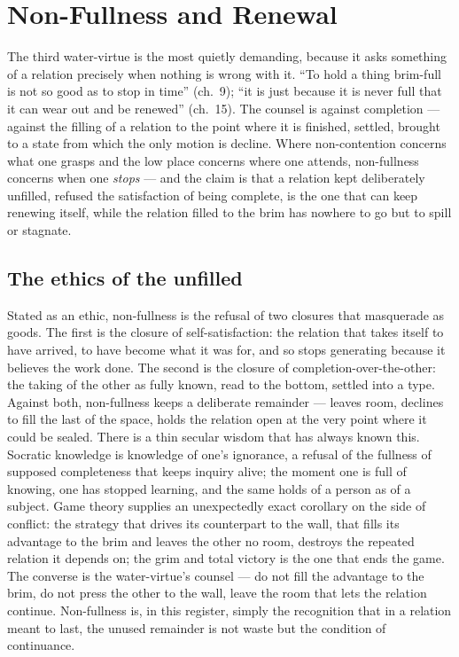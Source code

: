 \section{Non-Fullness and Renewal}
\label{p20:sec:nonfullness}

\noindent
The third water-virtue is the most quietly demanding, because it asks something of a relation precisely when nothing is wrong with it. ``To hold a thing brim-full is not so good as to stop in time'' (ch.~9); ``it is just because it is never full that it can wear out and be renewed'' (ch.~15). The counsel is against completion --- against the filling of a relation to the point where it is finished, settled, brought to a state from which the only motion is decline. Where non-contention concerns what one grasps and the low place concerns where one attends, non-fullness concerns when one \emph{stops} --- and the claim is that a relation kept deliberately unfilled, refused the satisfaction of being complete, is the one that can keep renewing itself, while the relation filled to the brim has nowhere to go but to spill or stagnate.

\subsection{The ethics of the unfilled}
\label{p20:sub:nonfull-ethics}

Stated as an ethic, non-fullness is the refusal of two closures that masquerade as goods. The first is the closure of self-satisfaction: the relation that takes itself to have arrived, to have become what it was for, and so stops generating because it believes the work done. The second is the closure of completion-over-the-other: the taking of the other as fully known, read to the bottom, settled into a type. Against both, non-fullness keeps a deliberate remainder --- leaves room, declines to fill the last of the space, holds the relation open at the very point where it could be sealed. There is a thin secular wisdom that has always known this. Socratic knowledge is knowledge of one's ignorance, a refusal of the fullness of supposed completeness that keeps inquiry alive; the moment one is full of knowing, one has stopped learning, and the same holds of a person as of a subject. Game theory supplies an unexpectedly exact corollary on the side of conflict: the strategy that drives its counterpart to the wall, that fills its advantage to the brim and leaves the other no room, destroys the repeated relation it depends on; the grim and total victory is the one that ends the game. The converse is the water-virtue's counsel --- do not fill the advantage to the brim, do not press the other to the wall, leave the room that lets the relation continue. Non-fullness is, in this register, simply the recognition that in a relation meant to last, the unused remainder is not waste but the condition of continuance.

